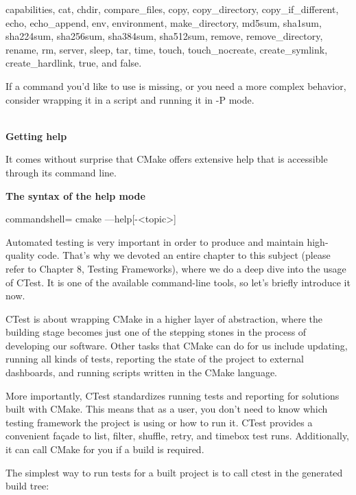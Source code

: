 capabilities, cat, chdir, compare\_files, copy, copy\_directory, copy\_if\_different, echo, echo\_append, env, environment, make\_directory, md5sum, sha1sum, sha224sum, sha256sum, sha384sum, sha512sum, remove, remove\_directory, rename, rm, server, sleep, tar, time, touch, touch\_nocreate, create\_symlink, create\_hardlink, true, and false.
 
If a command you'd like to use is missing, or you need a more complex behavior, consider wrapping it in a script and running it in -P mode.

\hspace*{\fill} \\ %
\noindent
\textbf{Getting help}

It comes without surprise that CMake offers extensive help that is accessible through its command line.

\textbf{The syntax of the help mode}

\begin{tcblisting}{commandshell={}}
cmake ––help[-<topic>]
\end{tcblisting}


Automated testing is very important in order to produce and maintain high-quality code. That's why we devoted an entire chapter to this subject (please refer to Chapter 8, Testing Frameworks), where we do a deep dive into the usage of CTest. It is one of the available command-line tools, so let's briefly introduce it now.

CTest is about wrapping CMake in a higher layer of abstraction, where the building stage becomes just one of the stepping stones in the process of developing our software. Other tasks that CMake can do for us include updating, running all kinds of tests, reporting the state of the project to external dashboards, and running scripts written in the CMake language.

More importantly, CTest standardizes running tests and reporting for solutions built with CMake. This means that as a user, you don't need to know which testing framework the project is using or how to run it. CTest provides a convenient façade to list, filter, shuffle, retry, and timebox test runs. Additionally, it can call CMake for you if a build is required.

The simplest way to run tests for a built project is to call ctest in the generated build tree:

